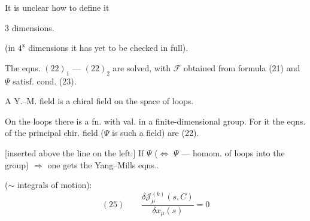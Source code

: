 It is unclear how to define it

 3 dimensions.

(in \(4^{\underline{\text{х}}}\) dimensions it has yet to be checked in full).

The eqns. \((22)_1\) --- \((22)_2\) are solved, with \(\mathcal{F}\) obtained from formula (21) and \(\Psi\) satisf. cond. (23).

A Y.–M. field is a chiral field on the space of loops.

On the loops there is a fn. with val. in a finite-dimensional group. For it the eqns. of the principal chir. field (\(\Psi\) is such a field) are (22).

[inserted above the line on the left:] If \(\Psi\) 
(\(\Leftrightarrow\) \(\Psi\) --- homom. of loops into the group) \(\Rightarrow\) one gets the Yang–Mills eqns..

 (\(\sim\) integrals of motion):
\[
(25)\qquad
\frac{\delta\mathcal{J}^{(k)}_\mu(s,C)}{\delta x_\mu(s)}=0
\]


